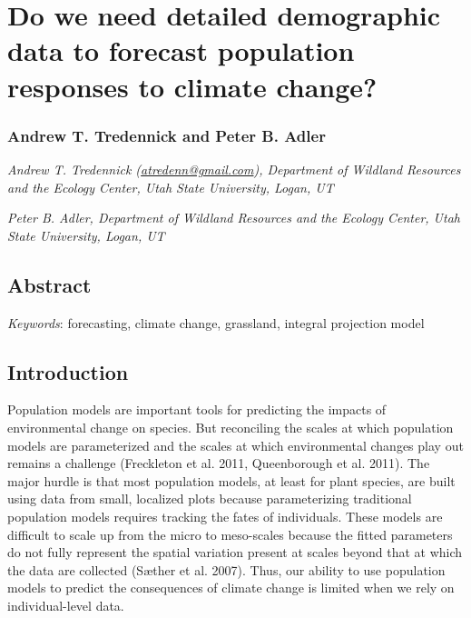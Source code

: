 \documentclass[12pt,]{article}
\author{}
\date{}
\begin{document}
\normalsize


\section{Do we need detailed demographic data to forecast population
responses to climate
change?}\label{do-we-need-detailed-demographic-data-to-forecast-population-responses-to-climate-change}

\subsubsection{Andrew T. Tredennick and Peter B.
Adler}\label{andrew-t.-tredennick-and-peter-b.-adler}

\emph{Andrew T. Tredennick
(\href{mailto:atredenn@gmail.com}{\href{mailto:atredenn@gmail.com}{atredenn@gmail.com}}),
Department of Wildland Resources and the Ecology Center, Utah State
University, Logan, UT}

\emph{Peter B. Adler, Department of Wildland Resources and the Ecology
Center, Utah State University, Logan, UT}

\subsection{Abstract}\label{abstract}

\emph{Keywords}: forecasting, climate change, grassland, integral
projection model

\subsection{Introduction}\label{introduction}

Population models are important tools for predicting the impacts of
environmental change on species. But reconciling the scales at which
population models are parameterized and the scales at which
environmental changes play out remains a challenge (Freckleton et al.
2011, Queenborough et al. 2011). The major hurdle is that most
population models, at least for plant species, are built using data from
small, localized plots because parameterizing traditional population
models requires tracking the fates of individuals. These models are
difficult to scale up from the micro to meso-scales because the fitted
parameters do not fully represent the spatial variation present at
scales beyond that at which the data are collected (Sæther et al. 2007).
Thus, our ability to use population models to predict the consequences
of climate change is limited when we rely on individual-level data.
\end{document}
